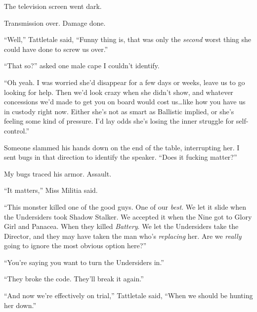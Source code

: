 





The television screen went dark.



Transmission over.  Damage done.



``Well,'' Tattletale said, ``Funny thing is, that was only the \emph{second} worst thing she could have done to screw us over.''



``That so?'' asked one male cape I couldn't identify.



``Oh yeah.  I was worried she'd disappear for a few days or weeks, leave us to go looking for help.  Then we'd look crazy when she didn't show, and whatever concessions we'd made to get you on board would cost us\ldots like how you have us in custody right now.  Either she's not as smart as Ballistic implied, or she's feeling some kind of pressure.  I'd lay odds she's losing the inner struggle for self-control.''



Someone slammed his hands down on the end of the table, interrupting her.  I sent bugs in that direction to identify the speaker.  ``Does it fucking matter?''



My bugs traced his armor.  Assault.



``It matters,'' Miss Militia said.



``This monster killed one of the good guys.  One of our \emph{best}.  We let it slide when the Undersiders took Shadow Stalker.  We accepted it when the Nine got to Glory Girl and Panacea.  When they killed \emph{Battery}.  We let the Undersiders take the Director, and they may have taken the man who's \emph{replacing} her.  Are we \emph{really }going to ignore the most obvious option here?''



``You're saying you want to turn the Undersiders in.''



``They broke the code.  They'll break it again.''



``And now we're effectively on trial,'' Tattletale said, ``When we should be hunting her down.''



